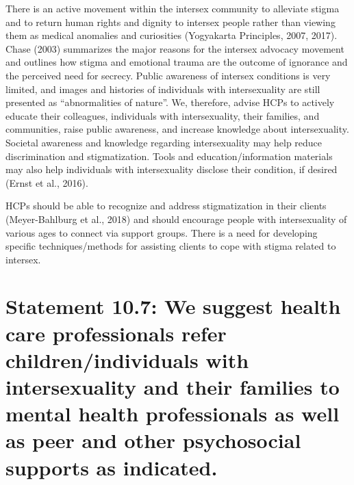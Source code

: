 \documentclass[
]{book}
\begin{document}
There is an active movement within the intersex community to alleviate stigma and to return
human rights and dignity to intersex people
rather than viewing them as medical anomalies
and curiosities (Yogyakarta Principles, 2007,
2017). Chase (2003) summarizes the major reasons for the intersex advocacy movement and
outlines how stigma and emotional trauma are
the outcome of ignorance and the perceived need
for secrecy. Public awareness of intersex conditions is very limited, and images and histories of
individuals with intersexuality are still presented
as ``abnormalities of nature''. We, therefore, advise
HCPs to actively educate their colleagues, individuals with intersexuality, their families, and
communities, raise public awareness, and increase
knowledge about intersexuality. Societal awareness
and knowledge regarding intersexuality may help
reduce discrimination and stigmatization. Tools
and education/information materials may also
help individuals with intersexuality disclose their
condition, if desired (Ernst et al., 2016).

HCPs should be able to recognize and address
stigmatization in their clients (Meyer-Bahlburg
et al., 2018) and should encourage people with
intersexuality of various ages to connect via support groups. There is a need for developing specific techniques/methods for assisting clients to
cope with stigma related to intersex.

\hypertarget{statement-10.7-we-suggest-health-care-professionals-refer-childrenindividuals-with-intersexuality-and-their-families-to-mental-health-professionals-as-well-as-peer-and-other-psychosocial-supports-as-indicated.}{%
\section*{Statement 10.7: We suggest health care professionals refer children/individuals with intersexuality and their families to mental health professionals as well as peer and other psychosocial supports as indicated.}\label{statement-10.7-we-suggest-health-care-professionals-refer-childrenindividuals-with-intersexuality-and-their-families-to-mental-health-professionals-as-well-as-peer-and-other-psychosocial-supports-as-indicated.}}
\end{document}
